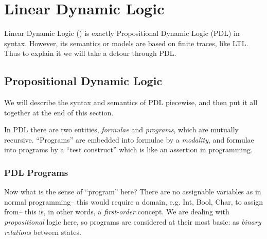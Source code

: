 

\begin{comment}
Note to writer:
Important commands: (math mode)
\di{x} writes x in diamond brackets
\sq{x} '' in square brackets
\prog  symbol for program, currently PI
\vphi  alternate phi symbol (curly) (\phi is the straight one)
\model symbol for a PDL/modal logic model
\neg   logical negation symbol
\end{comment}

\section {Linear Dynamic Logic}

Linear Dynamic Logic (\ldlf) is exactly Propositional Dynamic Logic (PDL)\cite{dynamic-logic} in syntax. However, its semantics or models are based on finite traces, like LTL. Thus to explain it we will take a detour through PDL.

\subsection{Propositional Dynamic Logic}

We will describe the syntax and semantics of PDL piecewise, and then put it all together at the end of this section.

In PDL there are two entities, \emph{formulae} and \emph{programs}, which are mutually recursive. ``Programs'' are embedded into formulae by a \emph{modality}, and formulae into programs by a ``test construct'' which is like an assertion in programming.

\subsubsection{PDL Programs}

Now what is the sense of ``program'' here? There are no assignable variables as in normal programming-- this would require a domain, e.g. Int, Bool, Char, to assign from-- this is, in other words, a \emph{first-order} concept. We are dealing with \emph{propositional} logic here, so programs are considered at their most basic: as \emph{binary relations} between states.
\begin{comment}
In functional programming, programs are thought of as functions; this more general view allows for nondeterminism and partial functions.
\end{comment}

